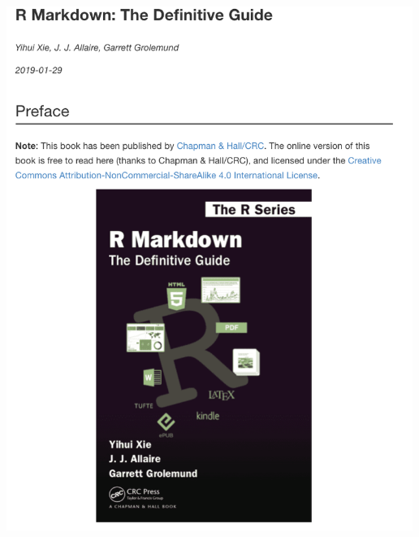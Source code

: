 \documentclass[]{article}
\begin{document}
\includegraphics[width=5.20833in,height=\textheight]{../figures/rmarkdown.png}
\end{document}
